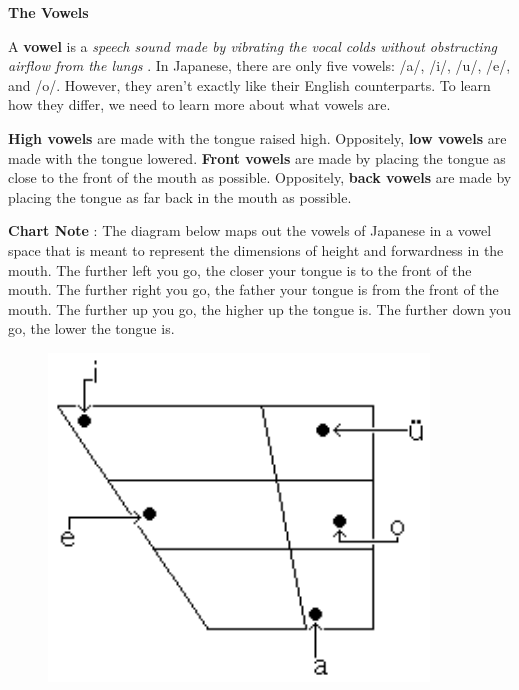 \begin{center}
\textbf{The Vowels }
\end{center}

\par{ A \textbf{vowel }is a \emph{speech sound made by vibrating the vocal colds without obstructing airflow from the lungs }. In Japanese, there are only five vowels: \slash a\slash , \slash i\slash , \slash u\slash , \slash e\slash , and \slash o\slash . However, they aren't exactly like their English counterparts. To learn how they differ, we need to learn more about what vowels are. }

\par{ \textbf{High vowels }are made with the tongue raised high. Oppositely, \textbf{low vowels }are made with the tongue lowered. \textbf{Front vowels }are made by placing the tongue as close to the front of the mouth as possible. Oppositely, \textbf{back vowels }are made by placing the tongue as far back in the mouth as possible. \hfill\break
}

\par{\textbf{Chart Note }: The diagram below maps out the vowels of Japanese in a vowel space that is meant to represent the dimensions of height and forwardness in the mouth. The further left you go, the closer your tongue is to the front of the mouth. The further right you go, the father your tongue is from the front of the mouth. The further up you go, the higher up the tongue is. The further down you go, the lower the tongue is. }

\begin{figure}[h]
\centering

\includegraphics[width=0.9\textwidth]{figs/第01章/第7課:_10majoraspects_fig/Vowel_chart.png}

\end{figure}
 
